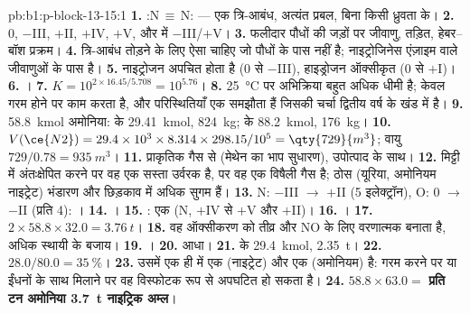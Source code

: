\begin{solution}{pb:b1:p-block-13-15:1}
\textbf{1.} :N\,$\equiv$\,N: --- एक त्रि-आबंध, अत्यंत प्रबल, बिना किसी ध्रुवता के।
\textbf{2.} 0, $-$III, $+$II, $+$IV, $+$V, और  में $-$III/$+$V।
\textbf{3.} फलीदार पौधों की जड़ों पर जीवाणु, तड़ित, हेबर--बॉश
प्रक्रम।
\textbf{4.} त्रि-आबंध तोड़ने के लिए ऐसा  चाहिए जो पौधों के पास
नहीं है; नाइट्रोजिनेस एंज़ाइम वाले जीवाणुओं के पास है।
\textbf{5.} नाइट्रोजन अपचित होता है (0 से $-$III), हाइड्रोजन ऑक्सीकृत (0 से $+$I)।
\textbf{6.} ।
\textbf{7.} $K = 10^{2 \times 16.45/5.708} = 10^{5.76}$।
\textbf{8.} \qty{25}{\celsius} पर अभिक्रिया बहुत अधिक धीमी है;
 केवल गरम होने पर काम करता है, और परिस्थितियाँ एक समझौता हैं जिसकी चर्चा
द्वितीय वर्ष के खंड में है।
\textbf{9.} \qty{58.8}{kmol} अमोनिया:  के \qty{29.41}{kmol},
\qty{824}{kg};  के \qty{88.2}{kmol}, \qty{176}{kg}।
\textbf{10.} $V(\ce{N2}) = 29.4 \times 10^3 \times 8.314 \times 298.15/10^5 =
\qty{729}{m^3}$; वायु $729/0.78 = \qty{935}{m^3}$।
\textbf{11.} प्राकृतिक गैस से (मेथेन का भाप सुधारण), 
उपोत्पाद के साथ।
\textbf{12.} मिट्टी में अंतःक्षेपित करने पर वह एक सस्ता उर्वरक है, पर वह एक विषैली
गैस है; ठोस (यूरिया, अमोनियम नाइट्रेट) भंडारण और छिड़काव में अधिक सुगम हैं।
\textbf{13.} N: $-$III $\to$ $+$II (5 इलेक्ट्रॉन), O: 0 $\to$ $-$II (प्रति
 4): ।
\textbf{14.} ।
\textbf{15.} : एक  (N, $+$IV से
$+$V और $+$II)।
\textbf{16.} ।
\textbf{17.} $2 \times 58.8 \times 32.0 = \qty{3.76}{t}$।
\textbf{18.} वह ऑक्सीकरण को तीव्र और NO के लिए वरणात्मक बनाता है, अधिक
स्थायी  के बजाय।
\textbf{19.} ।
\textbf{20.} आधा।
\textbf{21.}  के \qty{29.4}{kmol}, \qty{2.35}{t}।
\textbf{22.} $28.0/80.0 = \qty{35}{\percent}$।
\textbf{23.} उसमें एक ही  में एक  (नाइट्रेट) और एक  (अमोनियम)
है: गरम करने पर या ईंधनों के साथ मिलाने पर वह विस्फोटक रूप से अपघटित हो सकता है।
\textbf{24.} $58.8 \times 63.0 =$ \textbf{प्रति टन अमोनिया \qty{3.7}{t} नाइट्रिक
अम्ल}।
\end{solution}
